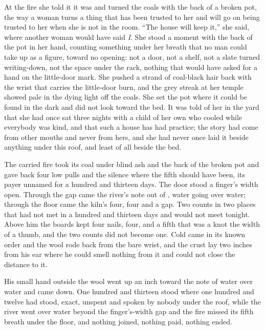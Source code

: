 At the fire she told it it was  and turned the coals with the back of a broken pot, the way a woman turns a thing that has been trusted to her and will go on being trusted to her when she is not in the room. “The house will keep it,” she said, where another woman would have said \emph{I}. She stood a moment with the back of the pot in her hand, counting something under her breath that no man could take up as a figure, toward no opening: not a door, not a shelf, not a slate turned writing-down, not the space under the rack, nothing that would have asked for a hand on the little-door mark. She pushed a strand of coal-black hair back with the wrist that carries the little-door burn, and the grey streak at her temple showed pale in the dying light off the coals. She set the pot where it could be found in the dark and did not look toward the bed. It was told of her in the yard that she had once sat three nights with a child of her own who cooled while everybody was kind, and that such a house has had practice; the story had come from other mouths and never from hers, and she had never once laid it beside anything under this roof, and least of all beside the bed.

The carried fire took its coal under blind ash and the back of the broken pot and gave back four low pulls and the silence where the fifth should have been, its payer unnamed for a hundred and thirteen days. The door stood a finger's width open. Through the gap came the river's note out of , water going over water; through the floor came the kiln's four, four and a gap. Two counts in two places that had not met in a hundred and thirteen days and would not meet tonight. Above him the boards kept four nails, four, and a fifth that was a knot the width of a thumb, and the two counts did not become one. Cold came in its known order and the wool rode back from the bare wrist, and the crust lay two inches from his ear where he could smell nothing from it and could not close the distance to it.

His small hand outside the wool went up an inch toward the note of water over water and came down. One hundred and thirteen stood where one hundred and twelve had stood, exact, unspent and spoken by nobody under the roof, while the river went over water beyond the finger's-width gap and the fire missed its fifth breath under the floor, and nothing joined, nothing paid, nothing ended.
